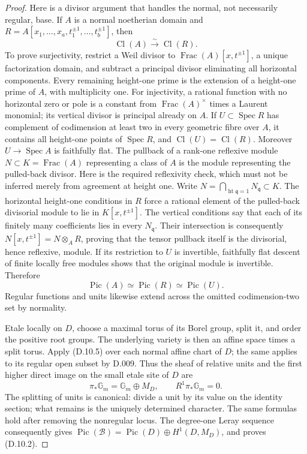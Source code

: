 \begin{proof}
Here is a divisor argument that handles the normal, not necessarily
regular, base.  If $A$ is a normal noetherian domain and
$R=A[x_1,\ldots,x_a,t_1^{\pm1},\ldots,t_b^{\pm1}]$, then
\[
 \operatorname{Cl}(A)\xrightarrow{\sim}\operatorname{Cl}(R).
                                                        \tag{D.10.4}
\]
To prove surjectivity, restrict a Weil divisor to
$\operatorname{Frac}(A)[x,t^{\pm1}]$, a unique factorization domain,
and subtract a principal divisor eliminating all horizontal
components.  Every remaining height-one prime is the extension of
a height-one prime of $A$, with multiplicity one.  For injectivity,
a rational function with no horizontal zero or pole is a constant
from $\operatorname{Frac}(A)^\times$ times a Laurent monomial; its
vertical divisor is principal already on $A$.
If $U\subset\operatorname{Spec}R$ has complement of codimension at
least two in every geometric fibre over $A$, it contains all
height-one points of $\operatorname{Spec}R$, and
$\operatorname{Cl}(U)=\operatorname{Cl}(R)$.  Moreover $U\to
\operatorname{Spec}A$ is faithfully flat.  The pullback of a
rank-one reflexive module $N\subset K=\operatorname{Frac}(A)$
representing a class of $A$ is the module representing the
pulled-back divisor.  Here is the required reflexivity check,
which must not be inferred merely from agreement at height one.
Write $N=\bigcap_{\operatorname{ht}\mathfrak q=1}N_{\mathfrak q}
\subset K$.  The horizontal height-one conditions in $R$ force a
rational element of the pulled-back divisorial module to lie in
$K[x,t^{\pm1}]$.  The vertical conditions say that each of its
finitely many coefficients lies in every $N_{\mathfrak q}$.
Their intersection is consequently
$N[x,t^{\pm1}]=N\otimes_A R$, proving that the tensor pullback
itself is the divisorial, hence reflexive, module.  If its
restriction to $U$ is invertible,
faithfully flat descent of finite locally free modules shows that
the original module is invertible.  Therefore
\[
 \operatorname{Pic}(A)\simeq\operatorname{Pic}(R)
                 \simeq\operatorname{Pic}(U).            \tag{D.10.5}
\]
Regular functions and units likewise extend across the omitted
codimension-two set by normality.

Etale locally on $D$, choose a maximal torus of its Borel group,
split it, and order the positive root groups.  The underlying variety
is then an affine space times a split torus.  Apply (D.10.5) over
each normal affine chart of $D$; the same applies to its regular
open subset by D.009.  Thus the sheaf of relative units and the
first higher direct image on the small etale site of $D$ are
\[
 \pi_*\mathbb G_m=\mathbb G_m\oplus M_D,
 \qquad R^1\pi_*\mathbb G_m=0.                           \tag{D.10.6}
\]
The splitting of units is canonical: divide a unit by its value on
the identity section; what remains is the uniquely determined
character.  The same formulas hold after removing the nonregular
locus.  The degree-one Leray sequence consequently gives
$\operatorname{Pic}(\mathcal B)=\operatorname{Pic}(D)
\oplus H^1(D,M_D)$, and proves (D.10.2).


\end{proof}
